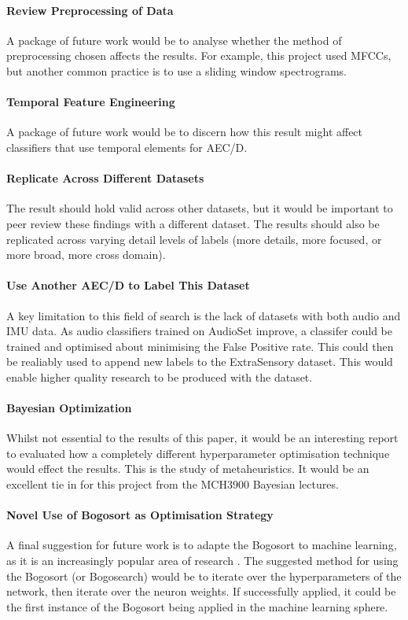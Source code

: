 \documentclass{UoNMCHA}
\numberwithin{equation}{section}
\begin{document}
\paragraph{Review Preprocessing of Data}
A package of future work would be to analyse whether the method of preprocessing chosen affects the results. For example, this project used MFCCs, but another common practice is to use a sliding window spectrograms.

\paragraph{Temporal Feature Engineering}
A package of future work would be to discern how this result might affect classifiers that use temporal elements for AEC/D.

\paragraph{Replicate Across Different Datasets}
The result should hold valid across other datasets, but it would be important to peer review these findings with a different dataset. The results should also be replicated across varying detail levels of labels (more details, more focused, or more broad, more cross domain).

\paragraph{Use Another AEC/D to Label This Dataset}
A key limitation to this field of search is the lack of datasets with both audio and IMU data. As audio classifiers trained on AudioSet improve, a classifer could be trained and optimised about minimising the False Positive rate. This could then be realiably used to append new labels to the ExtraSensory dataset. This would enable higher quality research to be produced with the dataset.

\paragraph{Bayesian Optimization}
Whilst not essential to the results of this paper, it would be an interesting report to evaluated how a completely different hyperparameter optimisation technique would effect the results. This is the study of metaheuristics. It would be an excellent tie in for this project from the MCH3900 Bayesian lectures.

\paragraph{Novel Use of Bogosort as Optimisation Strategy}
A final suggestion for future work is to adapte the Bogosort to machine learning, as it is an increasingly popular area of research \cite{Bogo_Gruber2007}\cite{Bogo_max}\cite{Bogo_Holzer2018}. The suggested method for using the Bogosort (or Bogosearch) would be to iterate over the hyperparameters of the network, then iterate over the neuron weights. If successfully applied, it could be the first instance of the Bogosort being applied in the machine learning sphere.
\newpage 
\end{document}
